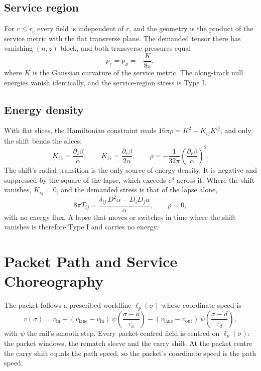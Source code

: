 \documentclass[11pt]{article}
\newcommand{\sig}{\sigma}
\newcommand{\rc}{r_{\mathrm c}}
\begin{document}
\subsection{Service region}

For $r\le\rc$ every field is independent of $r$, and the geometry is the product of the service metric with the flat transverse plane. The demanded tensor there has vanishing $(n,z)$ block, and both transverse pressures equal
\begin{equation}
p_r=p_\phi=-\frac{K}{8\pi},
\end{equation}
where $K$ is the Gaussian curvature of the service metric. The along-track null energies vanish identically, and the service-region stress is Type I.

\subsection{Energy density}

With flat slices, the Hamiltonian constraint reads $16\pi\rho=K^2-K_{ij}K^{ij}$, and only the shift bends the slices:
\begin{equation}
K_{\hat z\hat z}=\frac{\partial_z\beta}{\alpha},\qquad K_{\hat z\hat r}=\frac{\partial_r\beta}{2\alpha},
\qquad
\rho=-\frac{1}{32\pi}\left(\frac{\partial_r\beta}{\alpha}\right)^2 .
\end{equation}
The shift's radial transition is the only source of energy density. It is negative and suppressed by the square of the lapse, which exceeds $e^{4}$ across it. Where the shift vanishes, $K_{ij}=0$, and the demanded stress is that of the lapse alone,
\begin{equation}
8\pi T_{ij}=\frac{\delta_{ij}\,D^2\alpha-D_iD_j\alpha}{\alpha},\qquad \rho=0,
\end{equation}
with no energy flux. A lapse that moves or switches in time where the shift vanishes is therefore Type I and carries no energy.

\section{Packet Path and Service Choreography}

The packet follows a prescribed worldline $\ell_p(\sig)$ whose coordinate speed is
\begin{equation}
v(\sig)=v_{\mathrm{in}}+(v_{\mathrm{lane}}-v_{\mathrm{in}})\,\psi\!\left(\frac{\sig-a}{\tau_a}\right)-(v_{\mathrm{lane}}-v_{\mathrm{out}})\,\psi\!\left(\frac{\sig-d}{\tau_d}\right),
\end{equation}
with $\psi$ the rail's smooth step. Every packet-centred field is centred on $\ell_p(\sig)$: the packet windows, the rematch sleeve and the carry shift. At the packet centre the carry shift equals the path speed, so the packet's coordinate speed is the path speed.
\end{document}
